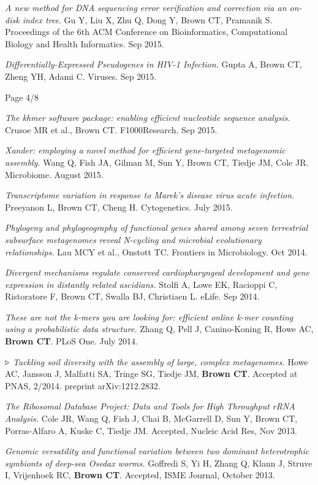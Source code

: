 \documentclass[margin,line]{resume}
\begin{document}
\begin{resume}
{\em A new method for DNA sequencing error verification and correction via an on-disk index tree}. Gu Y, Liu X, Zhu Q, Dong Y, Brown CT, Pramanik S.  Proceedings of the 6th ACM Conference on Bioinformatics, Computational Biology and Health Informatics. Sep 2015.

{\em Differentially-Expressed Pseudogenes in HIV-1 Infection.} Gupta A, Brown CT, Zheng YH, Adami C. Viruses. Sep 2015.

\vspace{1cm}
{\centerline {Page 4/8}}

\newpage

{\em The khmer software package: enabling efficient nucleotide sequence analysis.} Crusoe MR et al., Brown CT. F1000Research. Sep 2015.

{\em Xander: employing a novel method for efficient gene-targeted metagenomic assembly.} Wang Q, Fish JA, Gilman M, Sun Y, Brown CT, Tiedje JM, Cole JR. Microbiome. August 2015.

{\em Transcriptome variation in response to Marek’s disease virus acute infection.} Preeyanon L, Brown CT, Cheng H. Cytogenetics. July 2015.

{\em Phylogeny and phylogeography of functional genes shared among seven terrestrial subsurface metagenomes reveal N-cycling and microbial evolutionary relationships.} Lau MCY et al., Onstott TC. Frontiers in Microbiology. Oct 2014.

{\em Divergent mechanisms regulate conserved cardiopharyngeal development and gene expression in distantly related ascidians.} Stolfi A, Lowe EK, Racioppi C, Ristoratore F, Brown CT, Swalla BJ, Christiaen L. eLife. Sep 2014.

{\em These are not the k-mers you are looking for: efficient online
  k-mer counting using a probabilistic data structure.} Zhang Q, Pell
J, Canino-Koning R, Howe AC, {\bf Brown CT}.  PLoS One. July 2014.

{\color{red} ${\bf \triangleright}$}
{\em Tackling soil diversity with the assembly of large, complex metagenomes.}
Howe AC, Jansson J, Malfatti SA, Tringe SG, Tiedje JM, {\bf Brown CT}. Accepted at PNAS, 2/2014.  preprint arXiv:1212.2832.

{\em The Ribosomal Database Project: Data and Tools for High Throughput rRNA Analysis.} Cole JR, Wang Q, Fish J, Chai B, McGarrell D, Sun Y, Brown CT, Porras-Alfaro A, Kuske C, Tiedje JM.  Accepted, Nucleic Acid Res, Nov 2013.

{\em Genomic versatility and functional variation between two dominant
heterotrophic symbionts of deep-sea {\rm Osedax} worms.} Goffredi S, Yi H, Zhang Q, Klann J, Struve I, Vrijenhoek RC, {\bf Brown CT}. Accepted, ISME Journal, October 2013.


\end{resume}
\end{document}
